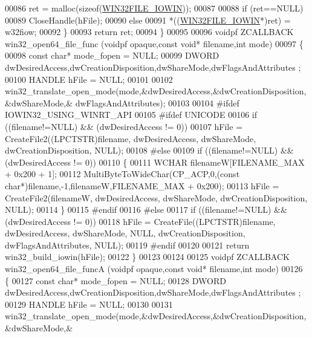 \begin{DoxyCode}
00086         ret = malloc(\textcolor{keyword}{sizeof}(\hyperlink{struct_w_i_n32_f_i_l_e___i_o_w_i_n}{WIN32FILE\_IOWIN}));
00087 
00088         \textcolor{keywordflow}{if} (ret==NULL)
00089             CloseHandle(hFile);
00090         \textcolor{keywordflow}{else}
00091             *((\hyperlink{struct_w_i_n32_f_i_l_e___i_o_w_i_n}{WIN32FILE\_IOWIN}*)ret) = w32fiow;
00092     \}
00093     \textcolor{keywordflow}{return} ret;
00094 \}
00095 
00096 voidpf ZCALLBACK win32\_open64\_file\_func (voidpf opaque,\textcolor{keyword}{const} \textcolor{keywordtype}{void}* filename,\textcolor{keywordtype}{int} mode)
00097 \{
00098     \textcolor{keyword}{const} \textcolor{keywordtype}{char}* mode\_fopen = NULL;
00099     DWORD dwDesiredAccess,dwCreationDisposition,dwShareMode,dwFlagsAndAttributes ;
00100     HANDLE hFile = NULL;
00101 
00102     win32\_translate\_open\_mode(mode,&dwDesiredAccess,&dwCreationDisposition,&dwShareMode,&
      dwFlagsAndAttributes);
00103 
00104 \textcolor{preprocessor}{#ifdef IOWIN32\_USING\_WINRT\_API}
00105 \textcolor{preprocessor}{#ifdef UNICODE}
00106     \textcolor{keywordflow}{if} ((filename!=NULL) && (dwDesiredAccess != 0))
00107         hFile = CreateFile2((LPCTSTR)filename, dwDesiredAccess, dwShareMode, dwCreationDisposition, NULL);
00108 \textcolor{preprocessor}{#else}
00109     \textcolor{keywordflow}{if} ((filename!=NULL) && (dwDesiredAccess != 0))
00110     \{
00111         WCHAR filenameW[FILENAME\_MAX + 0x200 + 1];
00112         MultiByteToWideChar(CP\_ACP,0,(\textcolor{keyword}{const} \textcolor{keywordtype}{char}*)filename,-1,filenameW,FILENAME\_MAX + 0x200);
00113         hFile = CreateFile2(filenameW, dwDesiredAccess, dwShareMode, dwCreationDisposition, NULL);
00114     \}
00115 \textcolor{preprocessor}{#endif}
00116 \textcolor{preprocessor}{#else}
00117     \textcolor{keywordflow}{if} ((filename!=NULL) && (dwDesiredAccess != 0))
00118         hFile = CreateFile((LPCTSTR)filename, dwDesiredAccess, dwShareMode, NULL, dwCreationDisposition, 
      dwFlagsAndAttributes, NULL);
00119 \textcolor{preprocessor}{#endif}
00120 
00121     \textcolor{keywordflow}{return} win32\_build\_iowin(hFile);
00122 \}
00123 
00124 
00125 voidpf ZCALLBACK win32\_open64\_file\_funcA (voidpf opaque,\textcolor{keyword}{const} \textcolor{keywordtype}{void}* filename,\textcolor{keywordtype}{int} mode)
00126 \{
00127     \textcolor{keyword}{const} \textcolor{keywordtype}{char}* mode\_fopen = NULL;
00128     DWORD dwDesiredAccess,dwCreationDisposition,dwShareMode,dwFlagsAndAttributes ;
00129     HANDLE hFile = NULL;
00130 
00131     win32\_translate\_open\_mode(mode,&dwDesiredAccess,&dwCreationDisposition,&dwShareMode,&

\end{DoxyCode}

